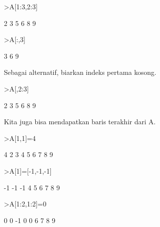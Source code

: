 \documentclass[a4paper,10pt]{article}
\begin{document}
\begin{eulernotebook}
\begin{eulercomment}
\begin{eulercomment}
\begin{eulercomment}
\begin{eulercomment}
\begin{eulercomment}
\begin{eulercomment}
\begin{eulercomment}
\begin{eulercomment}
\begin{eulercomment}
\begin{eulercomment}
\begin{eulercomment}
\begin{eulercomment}
\begin{eulercomment}
\begin{eulercomment}
\begin{eulercomment}
\begin{eulercomment}
\begin{eulercomment}
\begin{eulercomment}
\begin{eulercomment}
\begin{eulercomment}
\begin{eulercomment}
\begin{eulercomment}
\begin{eulerprompt}
>A[1:3,2:3]
\end{eulerprompt}
\begin{euleroutput}
              2             3 
              5             6 
              8             9 
\end{euleroutput}
\begin{eulerprompt}
>A[:,3]
\end{eulerprompt}
\begin{euleroutput}
              3 
              6 
              9 
\end{euleroutput}
\begin{eulercomment}
Sebagai alternatif, biarkan indeks pertama kosong.
\end{eulercomment}
\begin{eulerprompt}
>A[,2:3]
\end{eulerprompt}
\begin{euleroutput}
              2             3 
              5             6 
              8             9 
\end{euleroutput}
\begin{eulercomment}
Kita juga bisa mendapatkan baris terakhir dari A.
\end{eulercomment}
\begin{eulerprompt}
>A[1,1]=4
\end{eulerprompt}
\begin{euleroutput}
              4             2             3 
              4             5             6 
              7             8             9 
\end{euleroutput}
\begin{eulerprompt}
>A[1]=[-1,-1,-1]
\end{eulerprompt}
\begin{euleroutput}
             -1            -1            -1 
              4             5             6 
              7             8             9 
\end{euleroutput}
\begin{eulerprompt}
>A[1:2,1:2]=0
\end{eulerprompt}
\begin{euleroutput}
              0             0            -1 
              0             0             6 
              7             8             9 
\end{euleroutput}

\end{eulercomment}
\end{eulercomment}
\end{eulercomment}
\end{eulercomment}
\end{eulercomment}
\end{eulercomment}
\end{eulercomment}
\end{eulercomment}
\end{eulercomment}
\end{eulercomment}
\end{eulercomment}
\end{eulercomment}
\end{eulercomment}
\end{eulercomment}
\end{eulercomment}
\end{eulercomment}
\end{eulercomment}
\end{eulercomment}
\end{eulercomment}
\end{eulercomment}
\end{eulercomment}
\end{eulercomment}
\end{eulernotebook}
\end{document}
